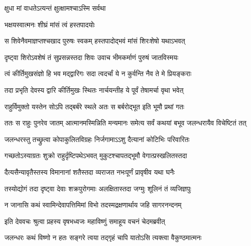 \onelineshloka
{क्षुधा मां वाधतेऽत्यन्तं क्षुत्क्षामश्चाऽस्मि सर्वथा} %




\onelineshloka
{भक्षयस्वात्मनः शीघ्रं मांसं त्वं हस्तपादयोः} %


\twolineshloka
{स शिवेनैवमाज्ञप्तश्चखाद पुरुषः स्वकम्}
{हस्तपादोद्भवं मांसं शिरःशेषो यथाऽभवत्} %

\twolineshloka
{दृष्ट्वा शिरोऽवशेषं तं सुप्रसन्नस्तदा शिवः}
{उवाच भीमकर्माणं पुरुषं जातविस्मयः} %


\twolineshloka
{त्वं कीर्तिमुखसंज्ञो हि भव मद्द्वारिगः सदा}
{त्वदर्चां ये न कुर्वन्ति नैव ते मे प्रियङ्कराः} %


\twolineshloka
{तदा प्रभृति देवस्य द्वारि कीर्तिमुखः स्थितः}
{नार्चयन्तीह ये पूर्वं तेषामर्चा वृथा भवेत्} %

\twolineshloka
{राहुर्विमुक्तो यस्तेन सोऽपि तद्बर्बरे स्थले}
{अतः स बर्बरोद्भूत इति भूमौ प्रथां गतः} %

\fourlineindentedshloka
{ततः स राहुः पुनरेव जातम्}
{आत्मानमस्मिन्निति मन्यमानः}
{समेत्य सर्वं कथयां बभूव}
{जलन्धरायैव विचेष्टितं तत्} %





\twolineshloka
{जलन्धरस्तु तच्छ्रुत्वा कोपाकुलितविग्रहः}
{निर्जगामाऽऽशु दैत्यानां कोटिभिः परिवारितः} %

\twolineshloka
{गच्छतोऽस्याग्रतः शुक्रो राहुर्दृष्टिपथेऽभवत्}
{मुकुटश्चापतद्भूमौ वेगात्प्रस्खलितस्तदा} %

\twolineshloka
{दैत्यसैन्यावृतैस्तस्य विमानानां शतैस्तदा}
{व्यराजत नभःपूर्णं प्रावृषीव यथा घनैः} %

\twolineshloka
{तस्योद्योगं तदा दृष्ट्वा देवाः शक्रपुरोगमाः}
{अलक्षितास्तदा जग्मुः शूलिनं तं व्यजिज्ञपुः} %


\twolineshloka
{न जानासि कथं स्वामिन्देवापत्तिमिमां विभो}
{तदस्मद्रक्षणार्थाय जहि सागरनन्दनम्} %


\twolineshloka
{इति देववचः श्रुत्वा प्रहस्य वृषभध्वजः}
{महाविष्णुं समाहूय वचनं चेदमब्रवीत्} %


\twolineshloka
{जलन्धरः कथं विष्णो न हतः सङ्गरे त्वया}
{तद्गृहं चापि यातोऽसि त्यक्त्वा वैकुण्ठमात्मनः} %


